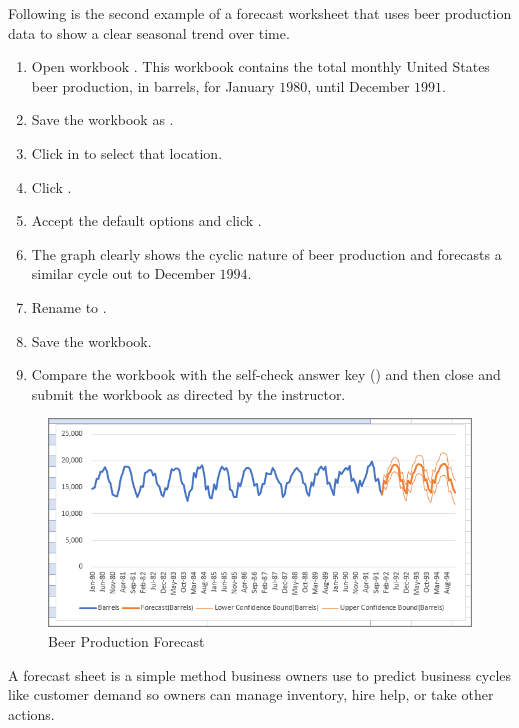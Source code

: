Following is the second example of a forecast worksheet that uses beer production data to show a clear seasonal trend over time.

\begin{enumbox}
	\begin{enumerate}
		\item Open workbook . This workbook contains the total monthly United States beer production, in barrels, for January $ 1980 $, until December $ 1991 $. 
		\item Save the workbook as .
		\item Click in  to select that location.
		\item Click .
		\item Accept the default options and click .
		\item The graph clearly shows the cyclic nature of beer production and forecasts a similar cycle out to December $ 1994 $.
		\item Rename  to .
		\item Save the  workbook.
		\item Compare the workbook with the self-check answer key () and then close and submit the  workbook as directed by the instructor.
	\end{enumerate}
\end{enumbox}

\begin{figure}[H]
	\centering
	\includegraphics[width=\maxwidth{.95\linewidth}]{gfx/ch08_fig13}
	\caption{Beer Production Forecast}
	\label{08:fig13}
\end{figure}

A forecast sheet is a simple method business owners use to predict business cycles like customer demand so owners can manage inventory, hire help, or take other actions.

